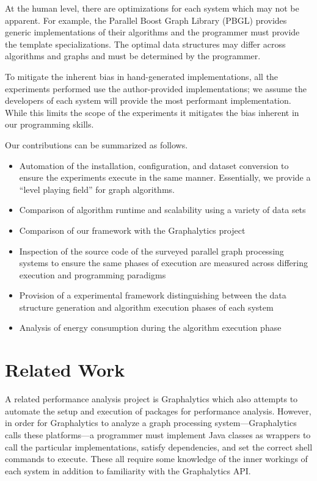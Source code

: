 \documentclass{llncs}
\begin{document}
At the human level, there are optimizations for each system which may not be apparent. For example, the Parallel Boost Graph Library (PBGL) \cite{Gregor:2005:PBGL} provides generic implementations of their algorithms and the programmer must provide the template specializations. The optimal data structures may differ across algorithms and graphs and must be determined by the programmer.

To mitigate the inherent bias in hand-generated implementations, all the experiments performed use the author-provided implementations; we assume the developers of each system will provide the most performant implementation. While this limits the scope of the experiments it mitigates the bias inherent in our programming skills.


Our contributions can be summarized as follows.
\begin{itemize}
	\item Automation of the installation, configuration, and dataset conversion to ensure the experiments execute in the same manner. Essentially, we provide a ``level playing field'' for graph algorithms.
	\item Comparison of algorithm runtime and scalability using a variety of data sets
	\item Comparison of our framework with the Graphalytics \cite{Capota:2015:Graphalytics} project
	\item Inspection of the source code of the surveyed parallel graph processing systems to ensure the same phases of execution are measured across differing execution and programming paradigms
	\item Provision of a experimental framework distinguishing between the data structure generation and algorithm execution phases of each system
	\item Analysis of energy consumption during the algorithm execution phase
\end{itemize}

\section{Related Work}
A related performance analysis project is Graphalytics \cite{Capota:2015:Graphalytics} which also attempts to automate the setup and execution of packages for performance analysis. However, in order for Graphalytics to analyze a graph processing system---Graphalytics calls these platforms---a programmer must implement Java classes as wrappers to call the particular implementations, satisfy dependencies, and set the correct shell commands to execute. These all require some knowledge of the inner workings of each system in addition to familiarity with the Graphalytics API.
\end{document}
